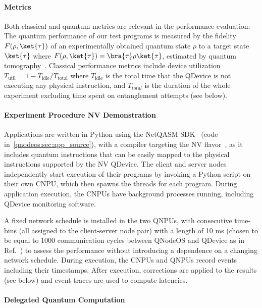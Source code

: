 \paragraph{Metrics}

Both classical and quantum metrics are relevant in the performance evaluation: The quantum performance of our test programs is measured by the fidelity $F(\rho,\ket{\tau})$ of an experimentally obtained quantum state $\rho$ to a target state $\ket{\tau}$ where $F(\rho,\ket{\tau}) = \bra{\tau}\rho\ket{\tau}$, estimated by quantum tomography~\cite{paris_quantum_2004}.
Classical performance metrics include device utilization $T_{\text{util}} = 1 - T_{\text{idle}} / T_{\text{total}}$ where $T_{\text{idle}}$ is the total time that the QDevice is not executing any physical instruction, and $T_{total}$ is the duration of the whole experiment excluding time spent on entanglement attempts (see below).

\paragraph{Experiment Procedure NV Demonstration}

Applications are written in Python using the NetQASM SDK~\cite{dahlberg_2022_netqasm} (code in~\cref{qnodeos:sec:app_source}), with a compiler targeting the NV flavor~\cite{dahlberg_2022_netqasm}, as it includes quantum instructions that can be easily mapped to the physical instructions supported by the NV QDevice.
The client and server nodes independently start execution of their programs by invoking a Python script on their own CNPU, which then spawns the threads for each program.
During application execution, the CNPUs have background processes running, including QDevice monitoring software.

A fixed network schedule is installed in the two QNPUs, with consecutive time-bins (all assigned to the client-server node pair) with a length of 10 ms (chosen to be equal to 1000 communication cycles between QNodeOS and QDevice as in Ref.~\cite{pompili_2022_experimental}) to assess the performance without introducing a dependence on a changing network schedule.
During execution, the CNPUs and QNPUs record events including their timestamps.
After execution, corrections are applied to the results (see below) and event traces are used to compute latencies.

\paragraph{Delegated Quantum Computation}

